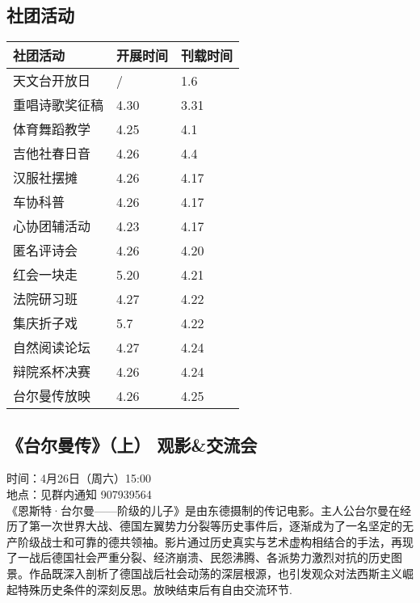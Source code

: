 \documentclass[letterpaper, 12pt]{article}
\begin{document}
\begin{multicols}{2}
\section{社团活动}
\begin{tabular}{|>{\centering\arraybackslash}m{}|m{}|m{}|}
    \hline
    社团活动 & 开展时间 & 刊载时间\\
    \hline\hline
    天文台开放日 & / & 1.6\\
    重唱诗歌奖征稿 & 4.30 & 3.31\\
    体育舞蹈教学 & 4.25 & 4.1\\
    吉他社春日音 & 4.26 & 4.4\\
    汉服社摆摊 & 4.26 & 4.17\\
    车协科普 & 4.26 & 4.17\\
    心协团辅活动 & 4.23 & 4.17\\
    匿名评诗会 & 4.26 & 4.20\\
    红会一块走 & 5.20 & 4.21\\
    法院研习班 & 4.27 & 4.22\\
    集庆折子戏 & 5.7 & 4.22\\
    自然阅读论坛 & 4.27 & 4.24\\
    辩院系杯决赛 & 4.26 & 4.24\\
    台尔曼传放映 & 4.26 & 4.25\\
    
    \hline
\end{tabular}
\subsection{《台尔曼传》（上） 观影\&交流会} %
时间：4月26日（周六）15:00
\\地点：见群内通知 907939564
\\《恩斯特·台尔曼——阶级的儿子》是由东德摄制的传记电影。主人公台尔曼在经历了第一次世界大战、德国左翼势力分裂等历史事件后，逐渐成为了一名坚定的无产阶级战士和可靠的德共领袖。影片通过历史真实与艺术虚构相结合的手法，再现了一战后德国社会严重分裂、经济崩溃、民怨沸腾、各派势力激烈对抗的历史图景。作品既深入剖析了德国战后社会动荡的深层根源，也引发观众对法西斯主义崛起特殊历史条件的深刻反思。放映结束后有自由交流环节.

\end{multicols}
\end{document}
